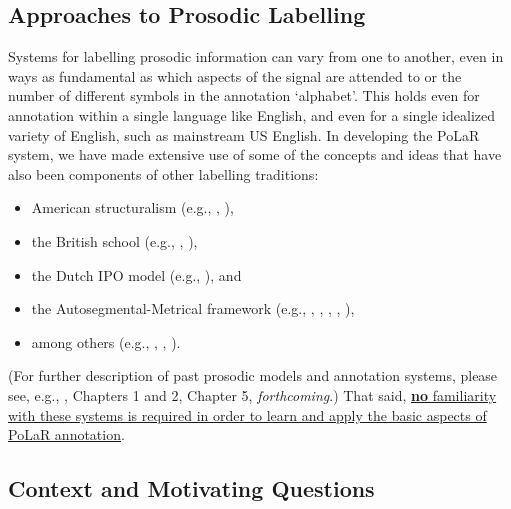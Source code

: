 \subsection{\DIFdelbegin {}\DIFdelend \DIFaddbegin {}\DIFaddend Approaches to Prosodic Labelling}\label{sec:past-approaches-to-prosodic-labelling}

Systems for labelling prosodic information can vary from one to another, even in ways as fundamental as which aspects of the signal are attended to or the number of different symbols in the annotation ‘alphabet’. This holds even for annotation within a single language like English, and even for a single idealized variety of English, such as mainstream US English. In developing the PoLaR system, we have made extensive use of some of the concepts and ideas that have also been components of other labelling traditions:

\begin{itemize}
\item American structuralism (e.g., \citealt{pike45}, \citealt{tragersmith51}),
\item the British school (e.g., \citealt{crystal69}, \citealt{oconnorarnold73}),
\item the Dutch IPO model (e.g., \citealt{t-hart-90}), and
\item the Autosegmental-Metrical framework (e.g., \citealt{pierrehumbert80}, \citealt{beckmanayers97}, \citealt{grabe-01}, \citealt{hualdeprieto16}, \citealt{dilleybreen18}),
\item among others (e.g., \citealt{hirst07}, \citealt{taylor98}, \citealt{xu12}).
\end{itemize}

(For further description of past prosodic models and annotation systems, please see, e.g., \citealt{roach94}, \citealt{ladd08} Chapters 1 and 2, \citealt{fery17} Chapter 5, \citeauthor{barnesshattuckhufnagel20} \textit{forthcoming}.) That said, \uline{\textbf{no} familiarity with these systems is required in order to learn and apply the basic aspects of PoLaR annotation}.

\subsection{Context and Motivating Questions}\label{sec:context-and-motivating-questions}

